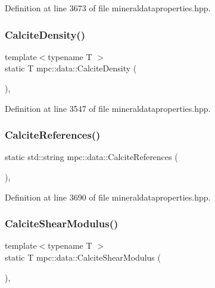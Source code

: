 Definition at line 3673 of file mineraldataproperties.\+hpp.

\mbox{\label{namespacempc_1_1data_aacf62e708ec7949c2e75003526476456}} 
\subsubsection{\texorpdfstring{Calcite\+Density()}{CalciteDensity()}}
{\footnotesize\ttfamily template$<$typename T $>$ \\
static T mpc\+::data\+::\+Calcite\+Density (\begin{DoxyParamCaption}{ }\end{DoxyParamCaption})\hspace{0.3cm}{\ttfamily [inline]}, {\ttfamily [static]}}



Definition at line 3547 of file mineraldataproperties.\+hpp.

\mbox{\label{namespacempc_1_1data_a9ec9cec996c0b8f47035d6c2f87dc5b4}} 
\subsubsection{\texorpdfstring{Calcite\+References()}{CalciteReferences()}}
{\footnotesize\ttfamily static std\+::string mpc\+::data\+::\+Calcite\+References (\begin{DoxyParamCaption}{ }\end{DoxyParamCaption})\hspace{0.3cm}{\ttfamily [inline]}, {\ttfamily [static]}}



Definition at line 3690 of file mineraldataproperties.\+hpp.

\mbox{\label{namespacempc_1_1data_ab8e26024b9887527fc940b07c61658bd}} 
\subsubsection{\texorpdfstring{Calcite\+Shear\+Modulus()}{CalciteShearModulus()}}
{\footnotesize\ttfamily template$<$typename T $>$ \\
static T mpc\+::data\+::\+Calcite\+Shear\+Modulus (\begin{DoxyParamCaption}{ }\end{DoxyParamCaption})\hspace{0.3cm}{\ttfamily [inline]}, {\ttfamily [static]}}



